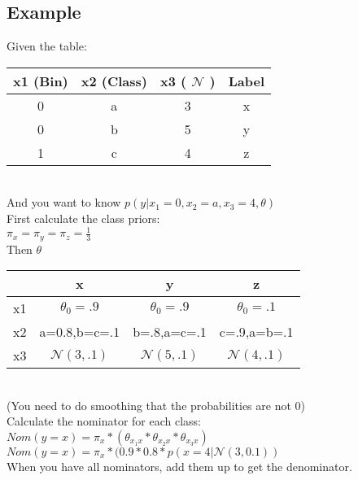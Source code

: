 \subsection{Example}
Given the table:
\begin{tabular}{| c | c | c | c |}
	\hline
	x1 (Bin) & x2 (Class) & x3 ( $\mathcal{N}$ ) & Label \\
	\hline
	0        & a          & 3                    & x     \\
	\hline
	0        & b          & 5                    & y     \\
	\hline
	1        & c          & 4                    & z     \\
	\hline
\end{tabular}\\ And you want to know $p(y|x_{1}=0, x_{2}=a, x_{3}=4, \theta)$\\
First calculate the class priors:\\ $\pi_{x}= \pi_{y}= \pi_{z}= \frac{1}{3}$\\ Then
$\theta$\\
\begin{tabular}{| c | c | c | c |}
	\hline
	   & x                   & y                   & z                   \\
	\hline
	x1 & $\theta_{0}=.9$     & $\theta_{0}=.9$     & $\theta_{0}=.1$     \\
	\hline
	x2 & a=0.8,b=c=.1        & b=.8,a=c=.1         & c=.9,a=b=.1         \\
	\hline
	x3 & $\mathcal{N}(3,.1)$ & $\mathcal{N}(5,.1)$ & $\mathcal{N}(4,.1)$ \\
	\hline
\end{tabular}\\ (You need to do smoothing that the probabilities are not 0)\\
Calculate the nominator for each class:\\
$Nom(y=x)=\pi_{x}* (\theta_{x_{1}x}* \theta_{x_{2}x}* \theta_{x_{3}x})$\\ $Nom(y
=x)=\pi_{x}* (0.9 * 0.8 * p(x=4|\mathcal{N}(3,0.1))$\\ When you have all
nominators, add them up to get the denominator.